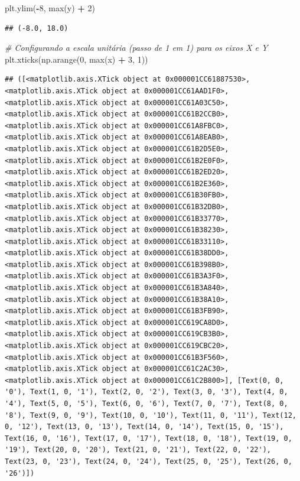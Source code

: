 \documentclass[
]{book}
\newenvironment{Shaded}{\begin{snugshade}}{\end{snugshade}}
\newcommand{\BuiltInTok}[1]{#1}
\newcommand{\CommentTok}[1]{\textcolor[rgb]{0.56,0.35,0.01}{\textit{#1}}}
\newcommand{\DecValTok}[1]{\textcolor[rgb]{0.00,0.00,0.81}{#1}}
\newcommand{\NormalTok}[1]{#1}
\newcommand{\OperatorTok}[1]{\textcolor[rgb]{0.81,0.36,0.00}{\textbf{#1}}}
\begin{document}
\begin{Shaded}
\begin{Highlighting}[]
\NormalTok{plt.ylim(}\OperatorTok{{-}}\DecValTok{8}\NormalTok{, }\BuiltInTok{max}\NormalTok{(y) }\OperatorTok{+} \DecValTok{2}\NormalTok{)}
\end{Highlighting}
\end{Shaded}

\begin{verbatim}
## (-8.0, 18.0)
\end{verbatim}

\begin{Shaded}
\begin{Highlighting}[]
\CommentTok{\# Configurando a escala unitária (passo de 1 em 1) para os eixos X e Y}
\NormalTok{plt.xticks(np.arange(}\DecValTok{0}\NormalTok{, }\BuiltInTok{max}\NormalTok{(x) }\OperatorTok{+} \DecValTok{3}\NormalTok{, }\DecValTok{1}\NormalTok{))}
\end{Highlighting}
\end{Shaded}

\begin{verbatim}
## ([<matplotlib.axis.XTick object at 0x000001CC61887530>, <matplotlib.axis.XTick object at 0x000001CC61AAD1F0>, <matplotlib.axis.XTick object at 0x000001CC61A03C50>, <matplotlib.axis.XTick object at 0x000001CC61B2CCB0>, <matplotlib.axis.XTick object at 0x000001CC61A8FBC0>, <matplotlib.axis.XTick object at 0x000001CC61A8EAB0>, <matplotlib.axis.XTick object at 0x000001CC61B2D5E0>, <matplotlib.axis.XTick object at 0x000001CC61B2E0F0>, <matplotlib.axis.XTick object at 0x000001CC61B2ED20>, <matplotlib.axis.XTick object at 0x000001CC61B2E360>, <matplotlib.axis.XTick object at 0x000001CC61B30FB0>, <matplotlib.axis.XTick object at 0x000001CC61B32DB0>, <matplotlib.axis.XTick object at 0x000001CC61B33770>, <matplotlib.axis.XTick object at 0x000001CC61B38230>, <matplotlib.axis.XTick object at 0x000001CC61B33110>, <matplotlib.axis.XTick object at 0x000001CC61B38DD0>, <matplotlib.axis.XTick object at 0x000001CC61B398B0>, <matplotlib.axis.XTick object at 0x000001CC61B3A3F0>, <matplotlib.axis.XTick object at 0x000001CC61B3A840>, <matplotlib.axis.XTick object at 0x000001CC61B38A10>, <matplotlib.axis.XTick object at 0x000001CC61B3FB90>, <matplotlib.axis.XTick object at 0x000001CC619CA8D0>, <matplotlib.axis.XTick object at 0x000001CC619CB3B0>, <matplotlib.axis.XTick object at 0x000001CC619CBC20>, <matplotlib.axis.XTick object at 0x000001CC61B3F560>, <matplotlib.axis.XTick object at 0x000001CC61C2AC30>, <matplotlib.axis.XTick object at 0x000001CC61C2B800>], [Text(0, 0, '0'), Text(1, 0, '1'), Text(2, 0, '2'), Text(3, 0, '3'), Text(4, 0, '4'), Text(5, 0, '5'), Text(6, 0, '6'), Text(7, 0, '7'), Text(8, 0, '8'), Text(9, 0, '9'), Text(10, 0, '10'), Text(11, 0, '11'), Text(12, 0, '12'), Text(13, 0, '13'), Text(14, 0, '14'), Text(15, 0, '15'), Text(16, 0, '16'), Text(17, 0, '17'), Text(18, 0, '18'), Text(19, 0, '19'), Text(20, 0, '20'), Text(21, 0, '21'), Text(22, 0, '22'), Text(23, 0, '23'), Text(24, 0, '24'), Text(25, 0, '25'), Text(26, 0, '26')])
\end{verbatim}
\end{document}
